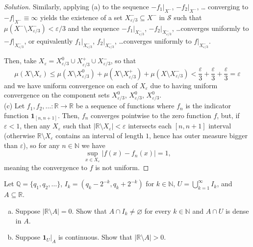 \documentclass[10pt]{article}
\providecommand{\eps}{\varepsilon}
\providecommand{\NN}{\mathbb N}
\providecommand{\QQ}{\mathbb Q}
\providecommand{\RR}{\mathbb R}
\providecommand{\ii}{\item}
\newenvironment{soln}{\begin{proof}[Solution]}{\end{proof}}
\providecommand{\abs}[1]{\left|#1\right|}
\begin{document}
\begin{soln}
    Similarly, applying (a) to the sequence $-f_1|_{X^-}$, $-f_2|_{X^-}$, \dots
    converging to $-f|_{X^-}\equiv\infty$ yields the existence of a set
    $X^-_{\eps/3}\subseteq X^-$ in $\mathcal S$
    such that $\mu(X^-\setminus X^-_{\eps/3}) < \eps/3$ and the sequence
    $-f_1|_{X^-_{\eps/3}}$, $-f_2|_{X^-_{\eps/3}}$, \dots converges
    uniformly to $-f|_{X^-_{\eps/3}}$, or equivalently
    $f_1|_{X^-_{\eps/3}}$, $f_2|_{X^-_{\eps/3}}$, \dots converges
    uniformly to $f|_{X^-_{\eps/3}}$.

    Then, take $X_\eps = X^0_{\eps/3}\cup X^+_{\eps/3}\cup X^-_{\eps/3}$, so that
    \begin{equation*}
        \mu(X\setminus X_\eps) \le
	\mu(X\setminus X^0_{\eps/3}) +
	\mu(X\setminus X^+_{\eps/3}) +
	\mu(X\setminus X^-_{\eps/3}) <
	\frac\eps3 + \frac\eps3 + \frac\eps3 = \eps
    \end{equation*}
    and we have uniform convergence on each of $X_\eps$
    due to having uniform convergence on the component sets
    $X^0_{\eps/3}$, $X^0_{\eps/3}$, $X^0_{\eps/3}$.
    \\

    (c) Let $f_1,f_2,\dots\colon\RR\to\RR$ be a sequence of functions
    where $f_n$ is the indicator function $\mathbf 1_{[n,n+1]}$.
    Then, $f_n$ converges pointwise to the zero function $f$,
    but, if $\eps<1$, then any $X_\eps$ such that $\abs{\RR\setminus X_\eps}<\eps$
    intersects each $[n,n+1]$ interval (otherwise $\RR\setminus X_\eps$
    contains an interval of length $1$, hence has outer measure bigger than $\eps$),
    so for any $n\in\NN$ we have
    \begin{equation*}
	\sup_{x\in X_\eps} |f(x) - f_n(x)| = 1,
    \end{equation*}
    meaning the convergence to $f$ is not uniform.
\end{soln}

\begin{problem}
    Let $\QQ = \{q_1,q_2,\dots\}$, $I_k = (q_k-2^{-k},q_k+2^{-k})$
    for $k\in\NN$, $U = \bigcup_{k=1}^\infty I_k$, and $A\subseteq\RR$.
    \begin{enumerate}[(a)]
	\ii Suppose $\abs{\RR\setminus A} = 0$. Show that
	$A\cap I_k\ne\varnothing$ for every $k\in\NN$ and
	$A\cap U$ is dense in $A$.
	\ii Suppose $\mathbf 1_U|_A$ is continuous. Show that
	$\abs{\RR\setminus A} > 0$.
    \end{enumerate}
\end{problem}
\end{document}
